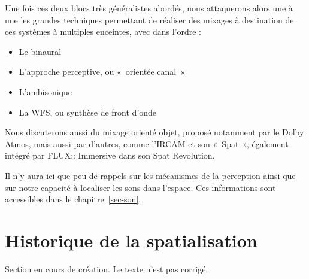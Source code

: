 \documentclass[
  letterpaper,
  DIV=11,
  numbers=noendperiod]{scrreprt}
\providecommand{\tightlist}{%
  \setlength{\itemsep}{0pt}\setlength{\parskip}{0pt}}\usepackage{longtable,booktabs,array}
\begin{document}
Une fois ces deux blocs très généralistes abordés, nous attaquerons
alors une à une les grandes techniques permettant de réaliser des
mixages à destination de ces systèmes à multiples enceintes, avec dans
l'ordre :

\begin{itemize}
\tightlist
\item
  Le binaural
\item
  L'approche perceptive, ou «~orientée canal~»
\item
  L'ambisonique
\item
  La WFS, ou synthèse de front d'onde
\end{itemize}

Nous discuterons aussi du mixage orienté objet, proposé notamment par le
Dolby Atmos, mais aussi par d'autres, comme l'IRCAM et son «~Spat~»,
également intégré par FLUX:: Immersive dans son Spat Revolution.

\begin{tcolorbox}[enhanced jigsaw, leftrule=.75mm, arc=.35mm, bottomtitle=1mm, colback=white, colbacktitle=quarto-callout-note-color!10!white, opacityback=0, left=2mm, rightrule=.15mm, opacitybacktitle=0.6, breakable, toptitle=1mm, titlerule=0mm, bottomrule=.15mm, toprule=.15mm, coltitle=black, title=\textcolor{quarto-callout-note-color}{\faInfo}\hspace{0.5em}{Note}]

Il n'y aura ici que peu de rappels sur les mécanismes de la perception
ainsi que sur notre capacité à localiser les sons dans l'espace. Ces
informations sont accessibles dans le chapitre~\ref{sec-son}.

\end{tcolorbox}

\hypertarget{sec-hist-spat}{%
\chapter{Historique de la spatialisation}\label{sec-hist-spat}}

\begin{tcolorbox}[enhanced jigsaw, leftrule=.75mm, arc=.35mm, bottomtitle=1mm, colback=white, colbacktitle=quarto-callout-warning-color!10!white, opacityback=0, left=2mm, rightrule=.15mm, opacitybacktitle=0.6, breakable, toptitle=1mm, titlerule=0mm, bottomrule=.15mm, toprule=.15mm, coltitle=black, title=\textcolor{quarto-callout-warning-color}{\faExclamationTriangle}\hspace{0.5em}{Avertissement}]

Section en cours de création. Le texte n'est pas corrigé.

\end{tcolorbox}
\end{document}
